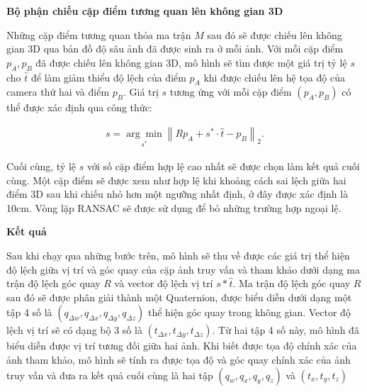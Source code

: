 \textbf{Bộ phận chiếu cặp điểm tương quan lên không gian 3D}

Những cặp điểm tương quan thỏa ma trận $M$ sau đó sẽ được chiếu lên không gian 3D qua bản đồ độ sâu ảnh đã được sinh ra ở mỗi ảnh. Với mỗi cặp điểm $p_A,p_B$ đã được chiếu lên không gian 3D, mô hình sẽ tìm được một giá trị tỷ lệ $s$ cho $\hat{t}$ để làm giảm thiểu độ lệch của điểm $p_A$ khi được chiếu lên hệ tọa độ của camera thứ hai và điểm $p_B$. Giá trị $s$ tương ứng với mỗi cặp điểm $(p_A,p_B)$ có thể được xác định qua công thức:

$$
\begin{aligned}
    s=\underset{s^*}{\arg \min }\left\|R p_A+s^* \cdot \hat{t}-p_B\right\|_2 .
\end{aligned}
$$

Cuối cùng, tỷ lệ $s$ với số cặp điểm hợp lệ cao nhất sẽ được chọn làm kết quả cuối cùng. Một cặp điểm sẽ được xem như hợp lệ khi khoảng cách sai lệch giữa hai điểm 3D sau khi chiếu nhỏ hơn một ngưỡng nhất định, ở đây được xác định là 10cm. Vòng lặp RANSAC sẽ được sử dụng để bỏ những trường hợp ngoại lệ.

\textbf{Kết quả}

Sau khi chạy qua những bước trên, mô hình sẽ thu về được các giá trị thể hiện độ lệch giữa vị trí và góc quay của cặp ảnh truy vấn và tham khảo dưới dạng ma trận độ lệch góc quay $R$ và vector độ lệch vị trí $s*\hat{t}$. Ma trận độ lệch góc quay $R$ sau đó sẽ được phân giải thành một Quaternion, được biểu diễn dưới dạng một tập 4 số là $(q_{\Delta w},q_{\Delta x},q_{\Delta y},q_{\Delta z})$ thể hiện góc quay trong không gian. Vector độ lệch vị trí sẽ có dạng bộ 3 số là $(t_{\Delta x},t_{\Delta y},t_{\Delta z})$. Từ hai tập 4 số này, mô hình đã biểu diễn được vị trí tương đối giữa hai ảnh. Khi biết được tọa độ chính xác của ảnh tham khảo, mô hình sẽ tính ra được tọa độ và góc quay chính xác của ảnh truy vấn và đưa ra kết quả cuối cùng là hai tập $(q_w,q_x,q_y,q_z)$ và $(t_x,t_y,t_z)$
